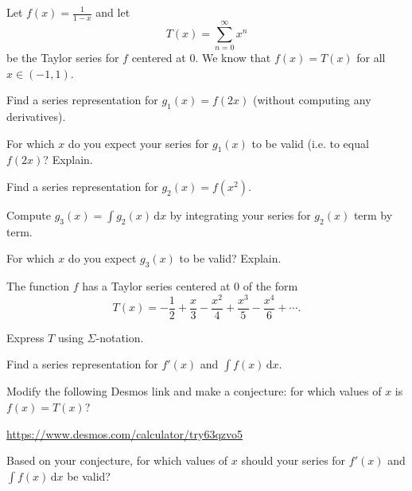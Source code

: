 \documentclass{workbook}
\begin{document}
\begin{slide}
	\question
	Let $f(x)=\frac{1}{1-x}$ and let
	\[
		T(x)=\sum_{n=0}^\infty x^n
	\]
	be the Taylor series for $f$ centered at $0$. We know that
	$f(x)=T(x)$ for all $x\in (-1,1)$.

	\begin{parts}
		\item Find a series representation for $g_1(x)=f(2x)$ (without
		computing any derivatives).
		\item For which $x$ do you expect your series for $g_1(x)$ to be valid (i.e. to equal
		$f(2x)$? Explain.
		\item Find a series representation for $g_2(x)=f(x^2)$.
		\item Compute $g_3(x)=\displaystyle \int g_2(x)\,\mathrm d x$ by integrating your series for $g_2(x)$ term by term.
		\item For which $x$ do you expect $g_3(x)$ to be valid? Explain.
	\end{parts}
\end{slide}

\begin{slide}
	\question
	The function $f$ has a Taylor series centered at $0$ of the form
	\[
		T(x)=-\frac{1}{2}+\frac{x}{3}-\frac{x^2}{4}+\frac{x^3}{5}-\frac{x^4}{6}+\cdots.
	\]

	\begin{parts}
		\item Express $T$ using $\Sigma$-notation.
		\item Find a series representation for $f'(x)$ and $\displaystyle\int f(x)\,\mathrm d x$.
		\item Modify the following Desmos link and make a conjecture: for
		which values of $x$ is $f(x)=T(x)$?

		\url{https://www.desmos.com/calculator/try63qzvo5}

		\item Based on your conjecture, for which values of $x$ should your series for $f'(x)$ and $\displaystyle \int f(x)\,\mathrm d x$ be
		valid?
	\end{parts}
\end{slide}
\end{document}
